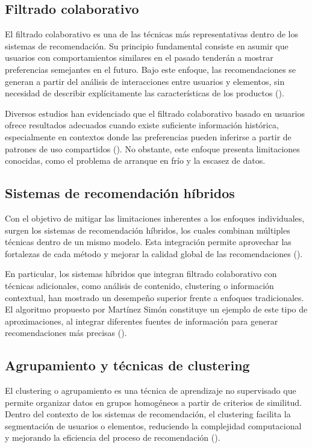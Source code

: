 \documentclass[11pt, letterpaper]{article}
\begin{document}
	\subsection{Filtrado colaborativo}
	El filtrado colaborativo es una de las técnicas más representativas dentro de los sistemas de recomendación. Su principio fundamental consiste en asumir que usuarios con comportamientos similares en el pasado tenderán a mostrar preferencias semejantes en el futuro. Bajo este enfoque, las recomendaciones se generan a partir del análisis de interacciones entre usuarios y elementos, sin necesidad de describir explícitamente las características de los productos (\cite{rodas_sr_colaborativo}).
	
	Diversos estudios han evidenciado que el filtrado colaborativo basado en usuarios ofrece resultados adecuados cuando existe suficiente información histórica, especialmente en contextos donde las preferencias pueden inferirse a partir de patrones de uso compartidos (\cite{dael_recomendacion_hibrida}). No obstante, este enfoque presenta limitaciones conocidas, como el problema de arranque en frío y la escasez de datos.
	
	\subsection{Sistemas de recomendación híbridos}
	Con el objetivo de mitigar las limitaciones inherentes a los enfoques individuales, surgen los sistemas de recomendación híbridos, los cuales combinan múltiples técnicas dentro de un mismo modelo. Esta integración permite aprovechar las fortalezas de cada método y mejorar la calidad global de las recomendaciones (\cite{revision_sr_turismo}).
	
	En particular, los sistemas híbridos que integran filtrado colaborativo con técnicas adicionales, como análisis de contenido, clustering o información contextual, han mostrado un desempeño superior frente a enfoques tradicionales. El algoritmo propuesto por Martínez Simón constituye un ejemplo de este tipo de aproximaciones, al integrar diferentes fuentes de información para generar recomendaciones más precisas (\cite{dael_recomendacion_hibrida}).
	
	\subsection{Agrupamiento y técnicas de clustering}
	El clustering o agrupamiento es una técnica de aprendizaje no supervisado que permite organizar datos en grupos homogéneos a partir de criterios de similitud. Dentro del contexto de los sistemas de recomendación, el clustering facilita la segmentación de usuarios o elementos, reduciendo la complejidad computacional y mejorando la eficiencia del proceso de recomendación (\cite{clusterdoc_agrupamiento}).
	
\end{document}
